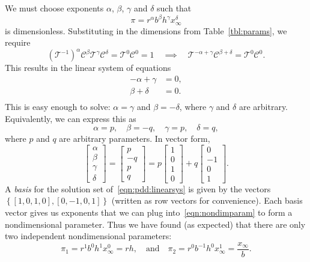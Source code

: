 \documentclass[reqno]{immbook}
\numberwithin{equation}{chapter}
\numberwithin{question}{section}
\numberwithin{theorem}{chapter}
\numberwithin{figure}{chapter}
\theoremstyle{definition}
\begin{document}
We must choose exponents $\alpha$, $\beta$, $\gamma$ and $\delta$
such that
\begin{equation}
   \pi = r^{\alpha} b^{\beta} h^{\gamma} x_{\infty}^{\delta}
\label{eqn:nondimparam}
\end{equation}
is dimensionless.  Substituting in the dimensions from 
Table~\ref{tbl:params}, we require
\begin{equation}
   \left(\mathcal{T}^{-1}\right)^{\alpha} \mathcal{C}^{\beta}
       \mathcal{T}^{\gamma} \mathcal{C}^{\delta} = \mathcal{T}^0\mathcal{C}^0 = 1
       \quad\implies\quad
       \mathcal{T}^{-\alpha+\gamma}\mathcal{C}^{\beta+\delta}
        = \mathcal{T}^{0}\mathcal{C}^{0}.
\end{equation}
This results in the linear system of equations
\begin{equation}
\begin{split}
   -\alpha + \gamma & = 0, \\
    \beta + \delta & = 0. \\
\label{eqn:pdd:linearsys}
\end{split}
\end{equation}
This is easy enough to solve: $\alpha = \gamma$ and $\beta = -\delta$,
where $\gamma$ and $\delta$ are arbitrary. Equivalently, we can express
this as
\begin{equation}
  \alpha = p, \quad \beta = -q, \quad \gamma = p, \quad \delta = q,
\end{equation}
where $p$ and $q$ are arbitrary parameters.
In vector form,
\begin{equation}
\begin{bmatrix} \alpha \\ \beta \\ \gamma \\ \delta \end{bmatrix}
  =
\begin{bmatrix} p \\ -q \\ p \\ q \end{bmatrix}
  =
p\begin{bmatrix} 1 \\ 0 \\ 1 \\ 0 \end{bmatrix} +
q\begin{bmatrix} 0 \\ -1 \\ 0 \\ 1 \end{bmatrix} .
\end{equation}
A \emph{basis} for the solution set of~\eqref{eqn:pdd:linearsys}
is given by the vectors $\left\{[1,0,1,0],[0,-1,0,1]\right\}$ (written as
row vectors for convenience).
Each basis vector gives us exponents that we can plug into~\eqref{eqn:nondimparam} to form a nondimensional parameter.
Thus we have found (as expected) that there are only two
independent nondimensional parameters:
\begin{equation}
  \pi_1 = r^1 b^0 h^1 x_{\infty}^0 = rh, \quad \textrm{and}\quad
  \pi_2 = r^0 b^{-1} h^0 x_{\infty}^1 = \frac{x_{\infty}}{b}. 
\end{equation}
\end{document}
